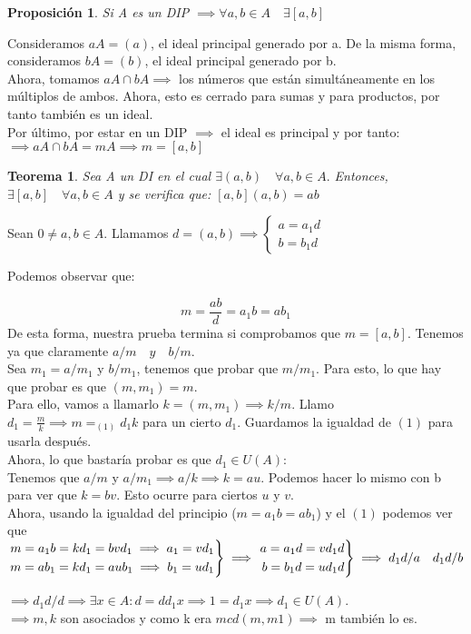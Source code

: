 \documentclass[11pt, a4paper, titlepage]{article}
\makeatletter
\newif\IfInSansMode
\let\oldsf\sffamily
\renewcommand*{\sffamily}{\oldsf\mathversion{sans}\InSansModetrue}
\let\oldnorm\normalfont
\renewcommand*{\normalfont}{\oldnorm\InSansModefalse\mathversion{normal}}
\renewenvironment{proof}[1][\proofname] {\vspace{-15pt}\par\pushQED{\qed}\normalfont\topsep6\p@\@plus6\p@\relax\trivlist\item[\hskip\labelsep\it#1\@addpunct{.}]\ignorespaces}{\popQED\endtrivlist\@endpefalse}
\renewenvironment{proof}[1][\proofname] {\par\pushQED{\qed}\normalfont\topsep6\p@\@plus6\p@\relax\trivlist\item[\hskip\labelsep\itshape\sffamily#1\@addpunct{.}]\ignorespaces}{\popQED\endtrivlist\@endpefalse}
\theoremstyle{theorem-style}
\newtheorem{nth}{Teorema}[section]
\newtheorem{nprop}{Proposición}[section]
\theoremstyle{definition-style}
\theoremstyle{remark-style}
\theoremstyle{example-style}
\newenvironment{rcases}
  {\left.\begin{aligned}}
  {\end{aligned}\right\rbrace}
\makeatother
\begin{document}
\begin{nprop}
	Si A es un DIP $\implies \forall a,b \in A \quad \exists [a,b]$
\end{nprop}
\begin{proof}
	Consideramos $aA = (a)$, el ideal principal generado por a. De la misma forma, consideramos $bA = (b)$, el ideal principal generado por b.\\
	Ahora, tomamos $aA \cap bA \implies$ los números que están simultáneamente en los múltiplos de ambos.
	Ahora, esto es cerrado para sumas y para productos, por tanto también es un ideal.\\
	Por último, por estar en un DIP $\implies$ el ideal es principal y por tanto:\\ $\implies aA\cap bA = mA \implies m = [a,b]$
\end{proof}


\begin{nth}
	Sea A un DI en el cual $\exists(a,b) \quad \forall a,b \in A.$ Entonces, $\exists [a,b] \quad \forall a,b \in A $ y se verifica que: $[a,b](a,b) = ab$
\end{nth}
\begin{proof}
	Sean $0 \ne a,b \in A$. Llamamos $d=(a,b) \implies \begin{cases}
	a = a_1 d\\
	b = b_1 d
\end{cases}$

Podemos observar que:

\[
m = \frac{ab}{d} = a_1b = ab_1
\]
De esta forma, nuestra prueba termina si comprobamos que $m = [a,b]$. Tenemos ya que claramente $a/m \quad y \quad b/m$.\\

Sea $m_1 = a/m_1 $ y $b/m_1$, tenemos que probar que $m/m_1$. Para esto, lo que hay que probar es que $(m,m_1) = m$.\\
Para ello, vamos a llamarlo $k = (m,m_1) \implies k/m$. Llamo $d_1 = \frac{m}{k} \implies m =_{(1)} d_1k$ para un cierto $d_1$. Guardamos la igualdad de $(1)$ para usarla después.\\
Ahora, lo que bastaría probar es que $d_1 \in U(A)$:\\
Tenemos que $a/m$ y $a/m_1 \implies a /k \implies k = au$. Podemos hacer lo mismo con b para ver que $k = bv$. Esto ocurre para ciertos $u$ y $v$.\\
Ahora, usando la igualdad del principio ($m = a_1b = ab_1$) y el $(1)$ podemos ver que $\begin{rcases}
	m = a_1b = kd_1 = bvd_1 \implies a_1 = vd_1\\
m = ab_1 = kd_1 = aub_1  \implies  b_1 = ud_1
\end{rcases} \implies \begin{rcases}
	a = a_1d = vd_1 d\\
b = b_1d = ud_1d
\end{rcases} \implies d_1d/a \quad d_1d/b$


$\implies d_1d /d \implies \exists x \in A : d = dd_1 x \implies 1 = d_1 x \implies d_1 \in U(A)$.\\
$\implies m,k$ son asociados y como k era $mcd(m,m1) \implies$ m también lo es.
\end{proof}
\end{document}

